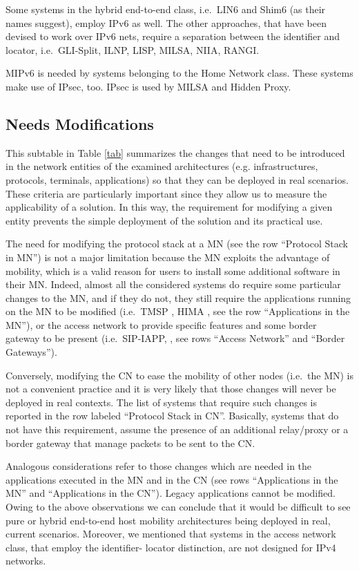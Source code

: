 \documentclass[preprint,12pt]{elsarticle}
\begin{document}
Some systems in the hybrid end-to-end class, i.e.~LIN6 and Shim6 (as their
names suggest), employ IPv6 as well. The other approaches, that have been devised to 
work over IPv6 nets, require a separation between the identifier 
and locator, i.e.~GLI-Split, ILNP, LISP, MILSA, NIIA, RANGI.

MIPv6 is needed by systems belonging to the Home Network class. These systems make use of IPsec, too. IPsec is used by MILSA and Hidden Proxy.

\subsection{Needs Modifications}

This subtable in Table \ref{tab} summarizes the changes that need to be introduced in the network entities of the examined architectures (e.g. infrastructures, protocols, terminals, applications) so that they can be deployed in real scenarios. 
These criteria are particularly important since they allow us to measure the applicability of a solution.
In this way, the requirement for modifying a given entity prevents the simple deployment of the solution and its practical use. 

The need for modifying the protocol stack at a MN (see the row ``Protocol Stack 
in MN'') is not a major limitation because the MN exploits the advantage of
mobility, which is a valid reason for users to install some additional 
software in their MN. Indeed, almost all the considered systems do require 
some particular changes to the MN, and if they do not, they still require 
the applications running on the MN to be modified (i.e.~TMSP \cite{LimYLL09}, 
HIMA \cite{Shenoy:2005}, see the row ``Applications in the MN''), or the 
access network to provide specific features and some border gateway to be 
present (i.e.~SIP-IAPP, \cite{WuYH07}, see rows ``Access Network'' and ``Border 
Gateways'').

Conversely, modifying the CN to ease the mobility of other nodes (i.e.~the MN) 
is not a convenient practice and it is very likely that those changes will never be deployed in real contexts. 
The list of systems that require such changes is reported in the row labeled ``Protocol Stack in CN''.
Basically, systems that do not have this requirement, assume the presence of an 
additional relay/proxy or a border gateway that manage packets to be sent to 
the CN.

Analogous considerations refer to those changes which are needed in the applications executed in the MN and in the CN (see rows “Applications in the MN” and “Applications in the CN”). 
Legacy applications cannot be modified. 
Owing to the above observations we can conclude that it would be difficult to see pure or hybrid end-to-end host mobility architectures being deployed in real, current scenarios. 
Moreover, we mentioned that systems in the access network class, that employ the identifier- locator distinction, are not designed for IPv4 networks.
\end{document}

